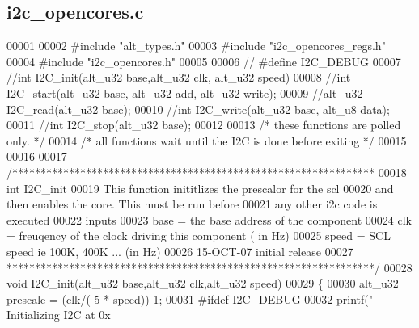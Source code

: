 \subsection{i2c\+\_\+opencores.\+c}
\label{software_2lms__ctr__bsp_2drivers_2src_2i2c__opencores_8c_source}

\begin{DoxyCode}
00001 
00002 \textcolor{preprocessor}{#include "alt_types.h"}
00003 \textcolor{preprocessor}{#include "i2c\_opencores\_regs.h"}
00004 \textcolor{preprocessor}{#include "i2c\_opencores.h"}
00005 
00006 \textcolor{comment}{// #define I2C\_DEBUG}
00007 \textcolor{comment}{//int I2C\_init(alt\_u32 base,alt\_u32 clk, alt\_u32 speed)}
00008 \textcolor{comment}{//int I2C\_start(alt\_u32 base, alt\_u32 add, alt\_u32 write);}
00009 \textcolor{comment}{//alt\_u32 I2C\_read(alt\_u32 base);}
00010 \textcolor{comment}{//int I2C\_write(alt\_u32 base, alt\_u8 data);}
00011 \textcolor{comment}{//int I2C\_stop(alt\_u32 base);}
00012 
00013 \textcolor{comment}{/* these functions are polled only.  */}
00014 \textcolor{comment}{/* all functions wait until the I2C is done before exiting */}
00015 
00016 
00017 \textcolor{comment}{/****************************************************************}
00018 \textcolor{comment}{int I2C\_init}
00019 \textcolor{comment}{            This function inititlizes the prescalor for the scl}
00020 \textcolor{comment}{            and then enables the core. This must be run before}
00021 \textcolor{comment}{            any other i2c code is executed}
00022 \textcolor{comment}{inputs}
00023 \textcolor{comment}{      base = the base address of the component}
00024 \textcolor{comment}{      clk = freuqency of the clock driving this component  ( in Hz)}
00025 \textcolor{comment}{      speed = SCL speed ie 100K, 400K ...            (in Hz)}
00026 \textcolor{comment}{15-OCT-07 initial release}
00027 \textcolor{comment}{*****************************************************************/}
00028 \textcolor{keywordtype}{void} I2C_init(alt_u32 base,alt_u32 clk,alt_u32 speed)
00029 \{
00030   alt_u32 prescale = (clk/( 5 * speed))-1;
00031 \textcolor{preprocessor}{#ifdef  I2C\_DEBUG}
00032         printf(\textcolor{stringliteral}{" Initializing  I2C at 0x%
}
\end{DoxyCode}
